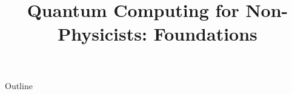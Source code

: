 \documentclass[xcolor=dvipsnames,compress,t,pdf,9pt]{beamer}
\title[\insertframenumber /\inserttotalframenumber]{Quantum Computing for Non-Physicists: Foundations}
\begin{document}
	\begin{frame}
	\titlepage
	\end{frame}

	\begin{frame}{Outline}
	    \tableofcontents
	\end{frame}

	
	
	
	
\end{document}
